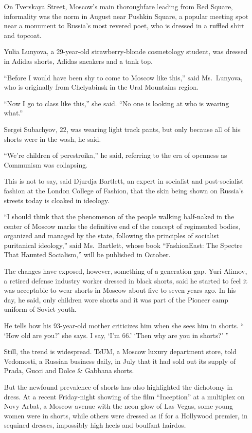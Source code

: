 ﻿\documentclass[12pt]{article}
\begin{document}
On Tverskaya Street, Moscow's main thoroughfare leading from Red Square, informality was the norm in
August near Pushkin Square, a popular meeting spot near a monument to Russia's most revered poet,
who is dressed in a ruffled shirt and topcoat.

Yulia Lunyova, a 29-year-old strawberry-blonde cosmetology student, was dressed in Adidas shorts,
Adidas sneakers and a tank top.

``Before I would have been shy to come to Moscow like this,'' said Ms.~Lunyova, who is originally
from Chelyabinsk in the Ural Mountains region.

``Now I go to class like this,'' she said. ``No one is looking at who is wearing what.''

Sergei Subachyov, 22, was wearing light track pants, but only because all of his shorts were in the
wash, he said.

``We're children of perestroika,'' he said, referring to the era of openness as Communism was
collapsing.

This is not to say, said Djurdja Bartlett, an expert in socialist and post-socialist fashion at the
London College of Fashion, that the skin being shown on Russia's streets today is cloaked in
ideology.

``I should think that the phenomenon of the people walking half-naked in the center of Moscow marks
the definitive end of the concept of regimented bodies, organized and managed by the state,
following the principles of socialist puritanical ideology,'' said Ms.~Bartlett, whose book
``FashionEast: The Spectre That Haunted Socialism,'' will be published in October.

The changes have exposed, however, something of a generation gap. Yuri Alimov, a retired defense
industry worker dressed in black shorts, said he started to feel it was acceptable to wear shorts in
Moscow about five to seven years ago. In his day, he said, only children wore shorts and it was part
of the Pioneer camp uniform of Soviet youth.

He tells how his 93-year-old mother criticizes him when she sees him in shorts. `` `How old are
you?' she says. I say, `I'm 66.' `Then why are you in shorts?' ''

Still, the trend is widespread. TsUM, a Moscow luxury department store, told Vedomosti, a Russian
business daily, in July that it had sold out its supply of Prada, Gucci and Dolce \& Gabbana shorts.

But the newfound prevalence of shorts has also highlighted the dichotomy in dress. At a recent
Friday-night showing of the film ``Inception'' at a multiplex on Novy Arbat, a Moscow avenue with
the neon glow of Las Vegas, some young women were in shorts, while others were dressed as if for a
Hollywood premier, in sequined dresses, impossibly high heels and bouffant hairdos.
\end{document}
